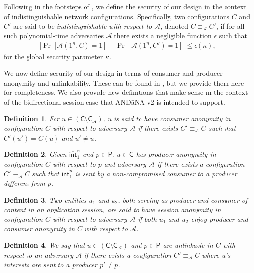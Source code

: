 \documentclass[10pt]{article}
\newtheorem{defn}{\textbf{Definition}}
\begin{document}
Following in the footsteps of \cite{andana}, we define the security of our design in the context of indistinguishable network configurations. Specifically, two configurations $C$ and $C'$ are said to be \emph{indistinguishable with respect to $\mathcal{A}$}, denoted $C \equiv_{\mathcal{A}} C'$, if for all such polynomial-time adversaries $\mathcal{A}$ there exists a negligible function $\epsilon$ such that 
\begin{align*}
\left|\Pr[\mathcal{A}(1^n, C) = 1] - \Pr[\mathcal{A}(1^n, C') = 1]\right| \leq \epsilon(\kappa),
\end{align*}
for the global security parameter $\kappa$.

We now define security of our design in terms of consumer and producer anonymity and unlinkability. These can be found in \cite{andana}, but we provide them here for completeness. We also provide new definitions that make sense in the context of the bidirectional session case that {\sf AND\=aNA-v2} is intended to support.
\begin{defn}
\cite{andana} For $u \in (\mathsf{C} \setminus \mathsf{C}_{\mathcal{A}})$, $u$ is said to have {\sf consumer anonymity} in configuration $C$ with respect to adversary $\mathcal{A}$ if there exists $C' \equiv_{\mathcal{A}} C$ such that $C'(u') = C(u)$ and $u' \not= u$. 
\end{defn}
\begin{defn}
\cite{andana} Given $\overline{\mathsf{int}}_1^n$ and $p \in \mathsf{P}$, $u \in \mathsf{C}$ has {\sf producer anonymity} in configuration $C$ with respect to $p$ and adversary $\mathcal{A}$ if there exists a configuration $C' \equiv_{\mathcal{A}} C$ such that $\overline{\mathsf{int}}_1^n$ is sent by a non-compromised consumer to a producer different from $p$. 
\end{defn}
\begin{defn}
Two entities $u_1$ and $u_2$, both serving as producer and consumer of content in an application session, are said to have {\sf session anonymity} in configuration $C$ with respect to adversary $\mathcal{A}$ if both $u_1$ and $u_2$ enjoy producer and consumer anonymity in $C$ with respect to $\mathcal{A}$.
\end{defn}
\begin{defn}
\cite{andana} We say that $u \in (\mathsf{C} \setminus \mathsf{C}_{\mathcal{A}})$ and $p \in \mathsf{P}$ are {\sf unlinkable} in $C$ with respect to an adversary $\mathcal{A}$ if there exists a configuration $C' \equiv_{\mathcal{A}} C$ where $u$'s interests are sent to a producer $p' \not= p$.
\end{defn}
\end{document}
